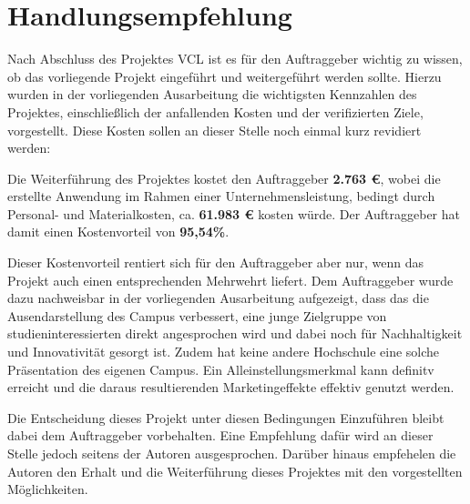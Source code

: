\section{Handlungsempfehlung}
\label{sec:Handlungsempfehlung}

Nach Abschluss des Projektes \ac{VCL} ist es für den Auftraggeber wichtig zu wissen,
ob das vorliegende Projekt eingeführt und weitergeführt werden sollte.
Hierzu wurden in der vorliegenden Ausarbeitung die wichtigsten Kennzahlen des Projektes,
einschließlich der anfallenden Kosten und der verifizierten Ziele, vorgestellt.
Diese Kosten sollen an dieser Stelle noch einmal kurz revidiert werden:

Die Weiterführung des Projektes kostet den Auftraggeber \textbf{2.763 €}, wobei
die erstellte Anwendung im Rahmen einer Unternehmensleistung, bedingt
durch Personal- und Materialkosten, ca. \textbf{61.983 €} kosten würde.
Der Auftraggeber hat damit einen Kostenvorteil von \textbf{95,54\%}.

Dieser Kostenvorteil rentiert sich für den Auftraggeber aber nur, wenn
das Projekt auch einen entsprechenden Mehrwehrt liefert.
Dem Auftraggeber wurde dazu nachweisbar in der vorliegenden Ausarbeitung aufgezeigt,
dass das die Ausendarstellung des Campus verbessert, eine junge Zielgruppe
von studieninteressierten direkt angesprochen wird und dabei noch für
Nachhaltigkeit und Innovativität gesorgt ist. Zudem hat keine andere
Hochschule eine solche Präsentation des eigenen Campus. Ein Alleinstellungsmerkmal
kann definitv erreicht und die daraus resultierenden Marketingeffekte effektiv genutzt werden.

Die Entscheidung dieses Projekt unter diesen Bedingungen Einzuführen
bleibt dabei dem Auftraggeber vorbehalten. Eine Empfehlung dafür wird an dieser
Stelle jedoch seitens der Autoren ausgesprochen. Darüber hinaus empfehelen die
Autoren den Erhalt und die Weiterführung dieses Projektes mit den vorgestellten Möglichkeiten.